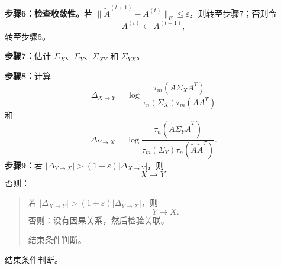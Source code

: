 \noindent\textbf{步骤6：检查收敛性。}若 $\lVert\widetilde A^{(t+1)}-A^{(t)}\rVert_F\le\varepsilon$，则转至步骤7；否则令
\[
A^{(t)}\leftarrow A^{(t+1)},
\]
转至步骤5。

\noindent\textbf{步骤7：}估计 $\Sigma_X$、$\Sigma_Y$、$\Sigma_{XY}$ 和 $\Sigma_{YX}$。

\noindent\textbf{步骤8：}计算
\[
\Delta_{X\to Y}=\log\frac{\tau_m(A\Sigma_XA^T)}{\tau_n(\Sigma_X)\tau_m(AA^T)}
\]
和
\[
\Delta_{Y\to X}=\log\frac{\tau_n(\widetilde A\Sigma_Y\widetilde A^T)}{\tau_m(\Sigma_Y)\tau_n(\widetilde A\widetilde A^T)}.
\]
\noindent\textbf{步骤9：}若 $|\Delta_{Y\to X}|>(1+\varepsilon)|\Delta_{X\to Y}|$，则
\[
X\to Y.
\]
否则：
\begin{quote}
若 $|\Delta_{X\to Y}|>(1+\varepsilon)|\Delta_{Y\to X}|$，则
\[
Y\to X.
\]
否则：没有因果关系，然后检验关联。

结束条件判断。
\end{quote}
结束条件判断。
